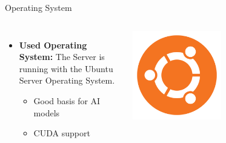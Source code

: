 \documentclass{beamer}
\begin{document}
\begin{frame}{Operating System}
  \begin{columns}
      \begin{itemize}
        \item \textbf{Used Operating System:} The Server is running with the Ubuntu Server Operating System. 
        \begin{itemize}
          \item Good basis for AI models
          \item CUDA support
        \end{itemize}
      \end{itemize}
      \centering
      \includegraphics[width=0.5\textwidth]{Ubuntu.png}
  \end{columns}

\end{frame}
\end{document}
